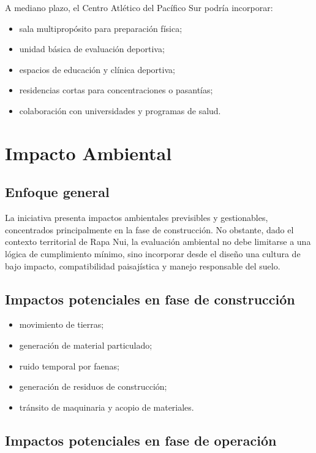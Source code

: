 \documentclass[12pt,letterpaper]{article}
\begin{document}
A mediano plazo, el Centro Atlético del Pacífico Sur podría incorporar:

\begin{itemize}
    \item sala multipropósito para preparación física;
    \item unidad básica de evaluación deportiva;
    \item espacios de educación y clínica deportiva;
    \item residencias cortas para concentraciones o pasantías;
    \item colaboración con universidades y programas de salud.
\end{itemize}

\section{Impacto Ambiental}

\subsection{Enfoque general}

La iniciativa presenta impactos ambientales previsibles y gestionables, concentrados principalmente en la fase de construcción. No obstante, dado el contexto territorial de Rapa Nui, la evaluación ambiental no debe limitarse a una lógica de cumplimiento mínimo, sino incorporar desde el diseño una cultura de bajo impacto, compatibilidad paisajística y manejo responsable del suelo.

\subsection{Impactos potenciales en fase de construcción}

\begin{itemize}
    \item movimiento de tierras;
    \item generación de material particulado;
    \item ruido temporal por faenas;
    \item generación de residuos de construcción;
    \item tránsito de maquinaria y acopio de materiales.
\end{itemize}

\subsection{Impactos potenciales en fase de operación}
\end{document}
